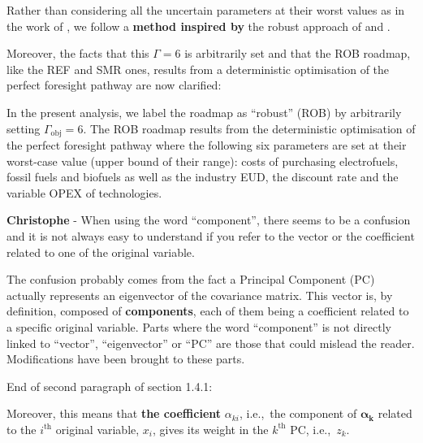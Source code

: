 \documentclass[12pt,a4paper]{article}
\def\ie{i.e.,\ }
\begin{document}
\begin{mdframed}[style=manuscript] %
Rather than considering all the uncertain parameters at their worst values as in the work of \citet{soyster1973convex}, we follow a \textbf{method inspired by} the robust approach of \citet{bertsimas2004price} and \citet{Moret2017PhDThesis}.
\end{mdframed}

Moreover, the facts that this $\Gamma=6$ is arbitrarily set and that the ROB roadmap, like the REF and SMR ones, results from a deterministic optimisation of the perfect foresight pathway are now clarified:

\begin{mdframed}[style=manuscript] %
In the present analysis, we label the roadmap as ``robust'' (ROB) by arbitrarily setting $\Gamma_{\text{obj}}= 6$. The ROB roadmap results from the deterministic optimisation of the perfect foresight pathway where the following six parameters are set at their worst-case value (upper bound of their range): costs of purchasing electrofuels, fossil fuels and biofuels as well as the industry EUD, the discount rate and the variable OPEX of technologies. 
\end{mdframed}

\begin{mdframed}[style=comment] %
{\color{violet} \textbf{Christophe}} - When using the word ``component'', there seems to be a confusion and it is not always easy to understand if you refer to the vector or the coefficient related to one of the original variable.
\end{mdframed}

\noindent The confusion probably comes from the fact a Principal Component (PC) actually represents an eigenvector of the covariance matrix. This vector is, by definition, composed of \textbf{components}, each of them being a coefficient related to a specific original variable. Parts where the word ``component'' is not directly linked to ``vector'', ``eigenvector'' or ``PC'' are those that could mislead the reader. Modifications have been brought to these parts.

{\color{blue} End of second paragraph of section 1.4.1}:

\begin{mdframed}[style=manuscript] %
Moreover, this means that \textbf{the coefficient} $\alpha_{ki}$, \ie the component of $\bm{\alpha}_{\mathbf{k}}$ related to the $i^{\text{th}}$ original variable, $x_i$,  gives its weight in the $k^{\text{th}}$ PC, \ie $z_k$. 
\end{mdframed}
\end{document}
